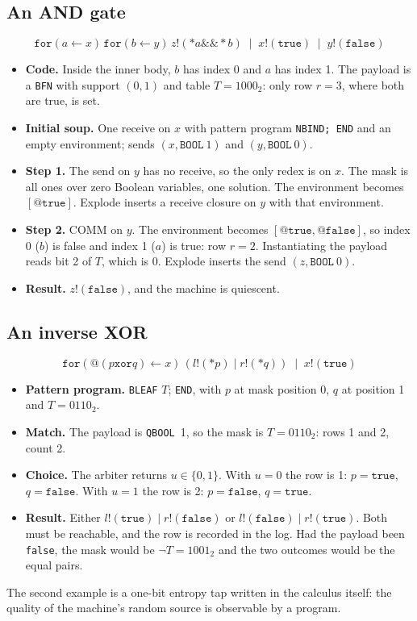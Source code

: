 \documentclass[10.5pt,a4paper]{extarticle}
\makeatletter
\newcommand{\kw}[1]{\texttt{#1}}
\newcommand{\tru}{\kw{true}}
\newcommand{\fls}{\kw{false}}
\newcommand{\band}{\mathbin{\&\&}}
\newcommand{\bxor}{\mathbin{\kw{xor}}}
\newcommand{\quo}[1]{@#1}
\newcommand{\drp}[1]{{*}#1}
\newcommand{\for}[3]{\kw{for}(#1 \leftarrow #2)\,#3}
\newcommand{\snd}[2]{#1!(#2)}
\newcommand{\cpar}{\mathbin{|}}
\theoremstyle{definition}
\theoremstyle{remark}
\makeatother
\begin{document}
\subsection*{An AND gate}

\[
\for{a}{x}{\for{b}{y}{\snd{z}{\drp{a} \band \drp{b}}}} \;\cpar\;
\snd{x}{\tru} \;\cpar\; \snd{y}{\fls}
\]
\begin{itemize}
\item \textbf{Code.} Inside the inner body, $b$ has index 0 and $a$ has
index 1. The payload is a \kw{BFN} with support $(0,1)$ and table
$T = 1000_2$: only row $r=3$, where both are true, is set.
\item \textbf{Initial soup.} One receive on $x$ with pattern program
\kw{NBIND; END} and an empty environment; sends $(x,\kw{BOOL}\ 1)$ and
$(y,\kw{BOOL}\ 0)$.
\item \textbf{Step 1.} The send on $y$ has no receive, so the only redex is
on $x$. The mask is all ones over zero Boolean variables, one solution.
The environment becomes $[\quo{\tru}]$. Explode inserts a receive closure on
$y$ with that environment.
\item \textbf{Step 2.} COMM on $y$. The environment becomes
$[\quo{\tru},\quo{\fls}]$, so index 0 ($b$) is false and index 1 ($a$) is
true: row $r = 2$. Instantiating the payload reads bit 2 of $T$, which is 0.
Explode inserts the send $(z,\kw{BOOL}\ 0)$.
\item \textbf{Result.} $\snd{z}{\fls}$, and the machine is quiescent.
\end{itemize}

\subsection*{An inverse XOR}

\[
\for{\quo{(p \bxor q)}}{x}{(\snd{l}{\drp{p}} \cpar \snd{r}{\drp{q}})}
\;\cpar\; \snd{x}{\tru}
\]
\begin{itemize}
\item \textbf{Pattern program.} \kw{BLEAF} $T$; \kw{END}, with $p$ at mask
position 0, $q$ at position 1 and $T = 0110_2$.
\item \textbf{Match.} The payload is \kw{QBOOL}~1, so the mask is
$T = 0110_2$: rows 1 and 2, count 2.
\item \textbf{Choice.} The arbiter returns $u \in \{0,1\}$. With $u=0$ the
row is 1: $p=\tru$, $q=\fls$. With $u=1$ the row is 2: $p=\fls$, $q=\tru$.
\item \textbf{Result.} Either $\snd{l}{\tru} \cpar \snd{r}{\fls}$ or
$\snd{l}{\fls} \cpar \snd{r}{\tru}$. Both must be reachable, and the row is
recorded in the log. Had the payload been \fls, the mask would be
$\neg T = 1001_2$ and the two outcomes would be the equal pairs.
\end{itemize}
The second example is a one-bit entropy tap written in the calculus itself:
the quality of the machine's random source is observable by a program.
\end{document}
